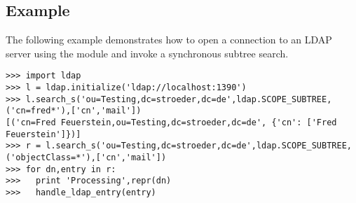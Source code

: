 
\subsection{Example \label{ldap-example}}

The following example demonstrates how to open a connection to an
LDAP server using the  module and invoke a synchronous
subtree search.

\begin{verbatim}
>>> import ldap
>>> l = ldap.initialize('ldap://localhost:1390')
>>> l.search_s('ou=Testing,dc=stroeder,dc=de',ldap.SCOPE_SUBTREE,('cn=fred*'),['cn','mail'])
[('cn=Fred Feuerstein,ou=Testing,dc=stroeder,dc=de', {'cn': ['Fred Feuerstein']})]
>>> r = l.search_s('ou=Testing,dc=stroeder,dc=de',ldap.SCOPE_SUBTREE,('objectClass=*'),['cn','mail'])
>>> for dn,entry in r:
>>>   print 'Processing',repr(dn)
>>>   handle_ldap_entry(entry)
\end{verbatim}



